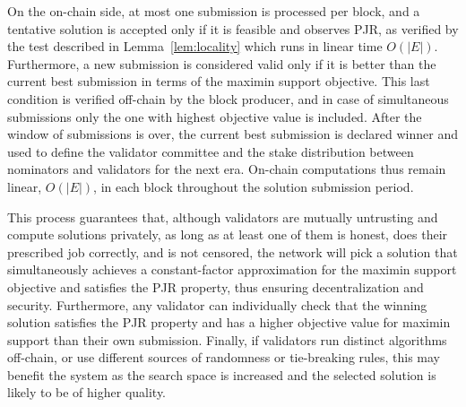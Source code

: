 On the on-chain side, at most one submission is processed per block, and a tentative solution is accepted only if it is feasible and observes PJR, as verified by the test described in Lemma~\ref{lem:locality} which runs in linear time $O(|E|)$. 
Furthermore, a new submission is considered valid only if it is better than the current best submission in terms of the maximin support objective. This last condition is verified off-chain by the block producer, and in case of simultaneous submissions only the one with highest objective value is included. After the window of submissions is over, the current best submission is declared winner and used to define the validator committee and the stake distribution between nominators and validators for the next era. On-chain computations thus remain linear, $O(|E|)$, in each block throughout the solution submission period.

This process guarantees that, although validators are mutually untrusting and compute solutions privately, as long as at least one of them is honest, does their prescribed job correctly, and is not censored, the network will pick a solution that simultaneously achieves a constant-factor approximation for the maximin support objective and satisfies the PJR property, thus ensuring decentralization and security. Furthermore, any validator can individually check that the winning solution satisfies the PJR property and has a higher objective value for maximin support than their own submission. Finally, if validators run distinct algorithms off-chain, or use different sources of randomness or tie-breaking rules, this may benefit the system as the search space is increased and the selected solution is likely to be of higher quality. 